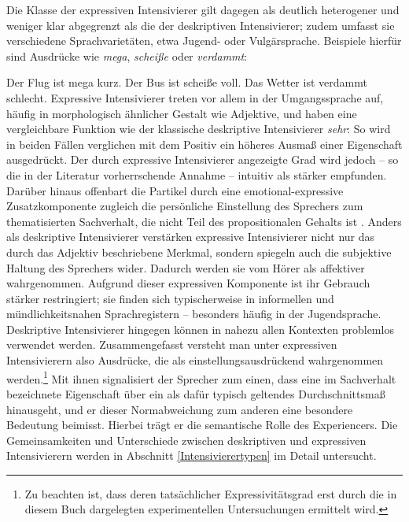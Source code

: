Die Klasse der expressiven Intensivierer gilt dagegen als deutlich heterogener und weniger klar abgegrenzt als die der deskriptiven Intensivierer; zudem umfasst sie verschiedene Sprachvarietäten, etwa Jugend- oder Vulgärsprache. Beispiele hierfür sind Ausdrücke wie \textit{mega}, \textit{scheiße} oder \textit{verdammt}:


\ea
\ea Der Flug ist mega kurz.
\ex Der Bus ist scheiße voll.
\ex Das Wetter ist verdammt schlecht.
\z
\z
Expressive Intensivierer treten vor allem in der Umgangssprache auf, häufig in morphologisch ähnlicher Gestalt wie Adjektive, und haben eine vergleichbare Funktion wie der klassische deskriptive Intensivierer \textit{sehr}: So wird in beiden Fällen verglichen mit dem Positiv ein höheres Ausmaß einer Eigenschaft ausgedrückt. Der durch expressive Intensivierer angezeigte Grad wird jedoch -- so die in der Literatur vorherrschende Annahme -- intuitiv als stärker empfunden. Darüber hinaus offenbart die Partikel durch eine emotional-expressive Zusatzkomponente zugleich die persönliche Einstellung des Sprechers zum thematisierten Sachverhalt, die nicht Teil des propositionalen Gehalts ist {\citep[vgl.][5]{Gutzmann.2013a}}. Anders als deskriptive Intensivierer verstärken expressive Intensivierer nicht nur das durch das Adjektiv beschriebene Merkmal, sondern spiegeln auch die subjektive Haltung des Sprechers wider. Dadurch werden sie vom Hörer als affektiver wahrgenommen. Aufgrund dieser expressiven Komponente ist ihr Gebrauch stärker restringiert; sie finden sich typischerweise in informellen und mündlichkeitsnahen Sprachregistern -- besonders häufig in der Jugendsprache. Deskriptive Intensivierer hingegen können in nahezu allen Kontexten problemlos verwendet werden. Zusammengefasst versteht man unter expressiven Intensivierern also Ausdrücke, die als einstellungsausdrückend wahrgenommen werden.\footnote{Zu beachten ist, dass deren tatsächlicher Expressivitätsgrad erst durch die in diesem Buch dargelegten experimentellen Untersuchungen ermittelt wird.} Mit ihnen signalisiert der Sprecher zum einen, dass eine im Sachverhalt bezeichnete Eigenschaft über ein als dafür typisch geltendes Durchschnittsmaß hinausgeht, und er dieser Normabweichung zum anderen eine besondere Bedeutung beimisst. Hierbei trägt er die semantische Rolle des Experiencers. Die Gemeinsamkeiten und Unterschiede zwischen deskriptiven und expressiven Intensivierern werden in Abschnitt {\ref{Intensivierertypen}} im Detail untersucht.


